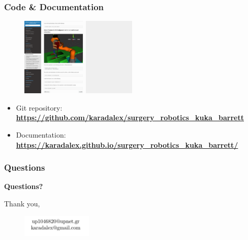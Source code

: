 \begin{frame}
\frametitle{Code \& Documentation}

\begin{center}
\begin{figure}[!htb]
\centering
\includegraphics[width=0.5\textwidth]{../images/documentation.png}
\end{figure}
\end{center}

\begin{itemize}
\item Git repository: \textbf{\url{https://github.com/karadalex/surgery_robotics_kuka_barrett}}
\item Documentation: \textbf{\url{https://karadalex.github.io/surgery_robotics_kuka_barrett/}}
\end{itemize}

\end{frame}


\begin{frame}
\frametitle{Questions}

\begin{center}
\begingroup
    \fontsize{14pt}{20pt}\selectfont
    \textbf{Questions?}\\
\endgroup

\vfill
Thank you,\\

\vfill
\begin{center}
\begin{figure}[!htb]
\centering
\includegraphics[width=0.3\textwidth]{../images/contact-info.png}
\end{figure}
\end{center}
\end{center}
\end{frame}